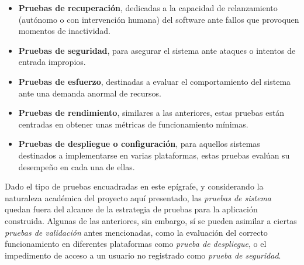 \begin{itemize}
	\item \textbf{Pruebas de recuperación}, dedicadas a la capacidad de relanzamiento (autónomo o con intervención humana) del software ante fallos que provoquen momentos de inactividad.
	\item \textbf{Pruebas de seguridad}, para asegurar el sistema ante ataques o intentos de entrada impropios.
	\item \textbf{Pruebas de esfuerzo}, destinadas a evaluar el comportamiento del sistema ante una demanda anormal de recursos.
	\item \textbf{Pruebas de rendimiento}, similares a las anteriores, estas pruebas están centradas en obtener unas métricas de funcionamiento mínimas.
	\item \textbf{Pruebas de despliegue o configuración}, para aquellos sistemas destinados a implementarse en varias plataformas, estas pruebas evalúan su desempeño en cada una de ellas.
\end{itemize}

Dado el tipo de pruebas encuadradas en este epígrafe, y considerando la naturaleza académica del proyecto aquí presentado, las \emph{pruebas de sistema} quedan fuera del alcance de la estrategia de pruebas para la aplicación construida. Algunas de las anteriores, sin embargo, sí se pueden asimilar a ciertas \emph{pruebas de validación} antes mencionadas, como la evaluación del correcto funcionamiento en diferentes plataformas como \emph{prueba de despliegue}, o el impedimento de acceso a un usuario no registrado como \emph{prueba de seguridad}.